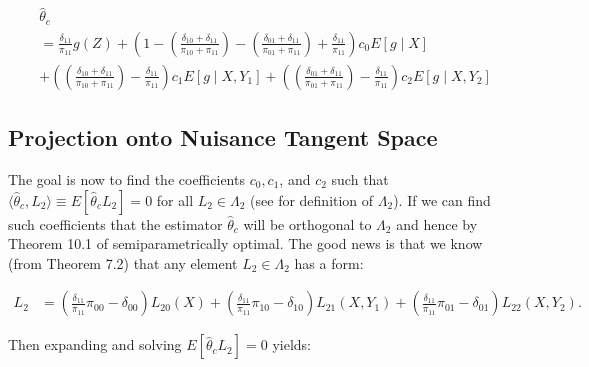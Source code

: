 \documentclass[12pt]{article}
\begin{document}
\begin{align}
  &\hat \theta_c \\ \nonumber
  &= \frac{\delta_{11}}{\pi_{11}} g(Z) + \left(1 -
    \left(\frac{\delta_{10} + \delta_{11}}{\pi_{10} + \pi_{11}}\right) -
    \left(\frac{\delta_{01} + \delta_{11}}{\pi_{01} + \pi_{11}}\right) + 
  \frac{\delta_{11}}{\pi_{11}}\right) c_0 E[g \mid X] \\ \nonumber
  &+
  \left(\left(\frac{\delta_{10} + \delta_{11}}{\pi_{10} + \pi_{11}}\right) - 
  \frac{\delta_{11}}{\pi_{11}}\right) c_1 E[g \mid X, Y_1] +
  \left(\left(\frac{\delta_{01} + \delta_{11}}{\pi_{01} + \pi_{11}}\right) - 
  \frac{\delta_{11}}{\pi_{11}}\right) c_2 E[g \mid X, Y_2]
\end{align}

\subsection{Projection onto Nuisance Tangent Space}

The goal is now to find the coefficients $c_0, c_1$, and $c_2$ such that 
$\langle \hat \theta_c, L_2\rangle \equiv E[\hat \theta_c L_2] = 0$ for 
all $L_2 \in \Lambda_2$ (see \cite{tsiatis2006semiparametric} for definition 
of $\Lambda_2$). If we can find such coefficients that the estimator $\hat
\theta_c$ will be orthogonal to $\Lambda_2$ and hence by Theorem 10.1 of 
\cite{tsiatis2006semiparametric} semiparametrically optimal. The good news 
is that we know (from Theorem 7.2) that any element $L_2 \in \Lambda_2$ has a
form:

\begin{align}
  L_2 &= 
  \left(\frac{\delta_{11}}{\pi_{11}}\pi_{00} - \delta_{00}\right) L_{20}(X) +
  \left(\frac{\delta_{11}}{\pi_{11}}\pi_{10} - \delta_{10}\right) L_{21}(X, Y_1) +
  \left(\frac{\delta_{11}}{\pi_{11}}\pi_{01} - \delta_{01}\right) L_{22}(X, Y_2).
\end{align}

Then expanding and solving $E[\hat \theta_c L_2] = 0$ yields:
\end{document}
